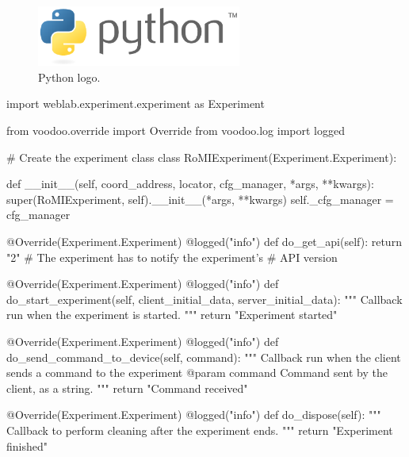 \begin{figure}[!htbp]
	\centering
	\includegraphics[width=0.6\textwidth]{fig/python}
	\caption{Python logo.}
	\label{fig:python}
\end{figure}

\clearpage
\begin{center}
\begin{minipage}{.9\textwidth}
\singlespace
{}
\begin{pyglist}[language=python, caption={WebLab experiment server development.},
	label={alg:weblab_server_api}, listingname={Algorithm}, numbers=left]
import weblab.experiment.experiment as Experiment

from voodoo.override import Override
from voodoo.log import logged

# Create the experiment class
class RoMIExperiment(Experiment.Experiment):

    def __init__(self, coord_address, locator, cfg_manager,
    *args, **kwargs):
        super(RoMIExperiment, self).__init__(*args, **kwargs)
        self._cfg_manager = cfg_manager

    @Override(Experiment.Experiment)
    @logged("info")
    def do_get_api(self):
        return "2" # The experiment has to notify the experiment's
                   # API version

    @Override(Experiment.Experiment)
    @logged("info")
    def do_start_experiment(self, client_initial_data,
    server_initial_data):
        """
        Callback run when the experiment is started.
        """
        return "Experiment started"

    @Override(Experiment.Experiment)
    @logged("info")
    def do_send_command_to_device(self, command):
        """
        Callback run when the client sends a command to the experiment
        @param command Command sent by the client, as a string.
        """
        return "Command received"

    @Override(Experiment.Experiment)
    @logged("info")
    def do_dispose(self):
        """
        Callback to perform cleaning after the experiment ends.
        """
        return "Experiment finished"
\end{pyglist}
\end{minipage}
\end{center}
\clearpage


